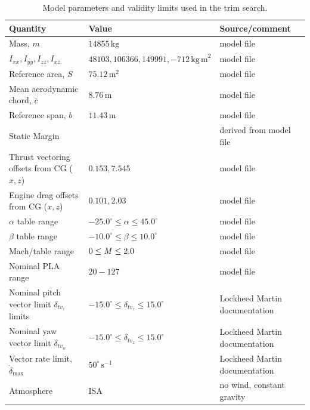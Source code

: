 \documentclass[conf]{new-aiaa}
\begin{document}
\begin{table}[h]
\centering
\footnotesize
\caption{Model parameters and validity limits used in the trim search. }
\label{tab:model_parameters}
\begin{tabular}{lll}
\toprule
Quantity & Value & Source/comment \\
\midrule
Mass, $m$ & $14855\,\mathrm{kg}$ & model file \\
$I_{xx}, I_{yy}, I_{zz}, I_{xz}$ & $48103, 106366, 149991, -712\,\mathrm{kg\,m}^2$ & model file \\
Reference area, $S$ & $75.12\,\mathrm{m}^2$ & model file \\
Mean aerodynamic chord, $\bar{c}$ & $8.76\,\mathrm{m}$ & model file \\
Reference span, $b$ & $11.43\,\mathrm{m}$ & model file \\
Static Margin & & derived from model file \\
Thrust vectoring offsets from CG ($x, z$) & $0.153, 7.545$ & model file \\
Engine drag offsets from CG ($x, z$) & $0.101, 2.03$ & model file \\
$\alpha$ table range & $-25.0^\circ\leq\alpha\leq45.0^\circ$ & model file \\
$\beta$ table range & $-10.0^\circ\leq\beta\leq10.0^\circ$ & model file \\
Mach/table range & $0\leq\mbox{\textit{M}}\leq 2.0$ & model file \\
Nominal PLA range & $20-127$ & model file \\
Nominal pitch vector limit $\delta_{tv_z}$ limits & $-15.0^\circ\leq\delta_{tv_z}\leq15.0^\circ$ & Lockheed Martin documentation \\
Nominal yaw vector limit $\delta_{tv_w}$ & $-15.0^\circ\leq\delta_{tv_z}\leq15.0^\circ$ & Lockheed Martin documentation \\
Vector rate limit, $\dot{\delta}_{\max}$ & $50^\circ\,\mathrm{s}^{-1}$ & Lockheed Martin documentation \\
Atmosphere & ISA & no wind, constant gravity \\
\bottomrule
\end{tabular}
\end{table}
\end{document}
